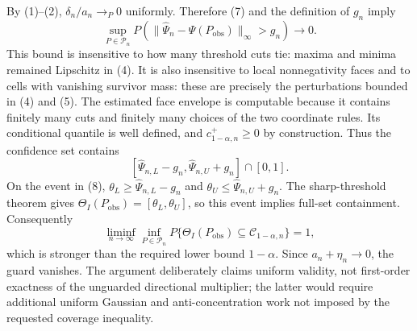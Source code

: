 By (1)--(2), \(\delta_n/a_n\to_P0\) uniformly.  Therefore (7) and the definition of \(g_n\) imply
\[
\sup_{P\in\mathcal P_n}P\left(
\|\widehat\Psi_n-\Psi(P_{\mathrm{obs}})\|_\infty>g_n
\right)\longrightarrow0.
\tag{8}
\]
This bound is insensitive to how many threshold cuts tie: maxima and minima remained Lipschitz in (4).  It is also insensitive to local nonnegativity faces and to cells with vanishing survivor mass: these are precisely the perturbations bounded in (4) and (5).  The estimated face envelope is computable because it contains finitely many cuts and finitely many choices of the two coordinate rules.  Its conditional quantile is well defined, and \(c_{1-\alpha,n}^+\ge0\) by construction.  Thus the confidence set contains
\[
[\widehat\Psi_{n,L}-g_n,\widehat\Psi_{n,U}+g_n]\cap[0,1].
\]
On the event in (8), \(\theta_L\ge\widehat\Psi_{n,L}-g_n\) and \(\theta_U\le\widehat\Psi_{n,U}+g_n\).  The sharp-threshold theorem gives \(\Theta_I(P_{\mathrm{obs}})=[\theta_L,\theta_U]\), so this event implies full-set containment.  Consequently
\[
\liminf_{n\to\infty}\inf_{P\in\mathcal P_n}
P\{\Theta_I(P_{\mathrm{obs}})\subseteq\mathcal C_{1-\alpha,n}\}=1,
\]
which is stronger than the required lower bound \(1-\alpha\).  Since \(a_n+\eta_n\to0\), the guard vanishes.  The argument deliberately claims uniform validity, not first-order exactness of the unguarded directional multiplier; the latter would require additional uniform Gaussian and anti-concentration work not imposed by the requested coverage inequality.